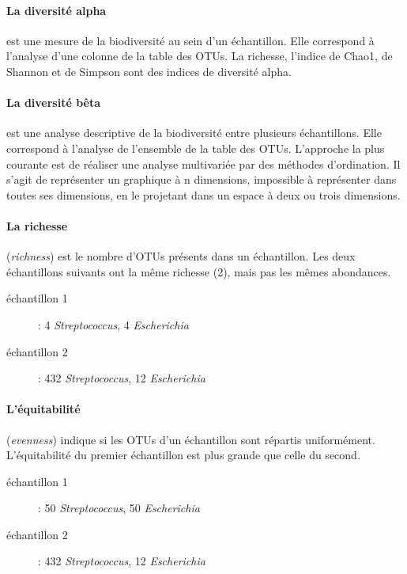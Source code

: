\documentclass[12pt,a4paper]{article}
\begin{document}
\paragraph{La diversité alpha} est une mesure de la biodiversité au sein d’un échantillon. Elle correspond à l'analyse d'une colonne de la table des OTUs. La richesse, l'indice de Chao1, de Shannon et de Simpson sont des indices de diversité alpha.

\paragraph{La diversité bêta} est une analyse descriptive de la biodiversité entre plusieurs échantillons. Elle correspond à l'analyse de l’ensemble de la table des OTUs. L’approche la plus courante est de réaliser une analyse multivariée par des méthodes d’ordination. Il s’agit de représenter un graphique à n dimensions, impossible à représenter dans toutes ses dimensions, en le projetant dans un espace à deux ou trois dimensions.

\paragraph{La richesse}(\textit{richness}) est le nombre d'OTUs présents dans un échantillon. Les deux échantillons suivants ont la même richesse (2), mais pas les mêmes abondances.

\begin{description}
\item[échantillon 1] : 4 \textit{Streptococcus}, 4 \textit{Escherichia}
\item[échantillon 2] : 432 \textit{Streptococcus}, 12 \textit{Escherichia}
\end{description}

\paragraph{L'équitabilité}(\textit{evenness}) indique si les OTUs d’un échantillon sont répartis uniformément.
L'équitabilité du premier échantillon est plus grande que celle du second.

\begin{description}
\item[échantillon 1] : 50 \textit{Streptococcus}, 50 \textit{Escherichia}
\item[échantillon 2] : 432 \textit{Streptococcus}, 12 \textit{Escherichia}
\end{description}
\end{document}
